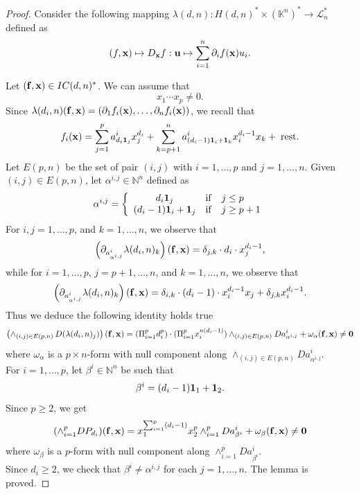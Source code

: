 \documentclass[11pt]{amsart}
\newcommand{\field}[1]{\mathbb{#1}}
\newcommand{\K}{\field{K}}
\newcommand{\N}{\field{N}}
\newcommand{\aph}{{\alpha}}
\newcommand{\bun}{{\bf 1}}
\newcommand{\bbo}{{\bf 0}}
\newcommand{\bbf}{{\bf f}}
\newcommand{\bu}{{\bf u}}
\newcommand{\bx}{{\bf x}}
\newcommand{\cL}{\mathcal{L}}
\newcommand{\dd}{{\partial}}
\newcommand{\dlt}{{\delta}}
\newcommand{\Kn}{{\K^n}}
\newcommand{\lbd}{{\lambda}}
\newcommand{\omg}{\omega}
\numberwithin{equation}{section}
\numberwithin{equation}{section}
\begin{document}
\begin{proof}
Consider the following mapping $\lbd(d,n) : H(d,n)^*\times (\Kn)^* 
\to \cL_n^*$ defined as
$$
(f,\bx) \mapsto D_\bx f :\bu \mapsto \sum_{i=1}^n \dd_i f(\bx) u_i.
$$

Let $(\bbf,\bx) \in IC(d,n)^*$. 
We can assume that 
$$
x_1\cdots x_p \neq 0.
$$
Since $\lbd(d_i,n)(\bbf,\bx) = (\dd_1f_i(\bx),\ldots,\dd_n f_i(\bx))$, we 
recall that 
$$
f_i (\bx) = \sum_{j=1}^p a_{d_i\bun_j}^i x_j^{d_i} + \sum_{k=p+1}^n
a_{(d_i-1)\bun_i + \bun_k}^i x_i^{d_i-1}x_k + \; {\rm  rest}.
$$
Let $E(p,n)$ be the set of pair $(i,j)$ with $i=1,\ldots,p$ and 
$j=1,\ldots,n$. Given $(i,j) \in E(p,n)$, let $\aph^{i,j} \in \N^n$ defined
as
$$
\aph^{i,j} = 
\left\{
\begin{array}{ccl}
d_i \bun_j & {\rm if} & j \leq p 
\\
(d_i-1)\bun_i + \bun_j  & {\rm if} & j \geq p + 1
\end{array}
\right.
$$
For $i,j = 1,\ldots,p$, and $k=1,\ldots,n$, we observe that
$$
\left(\dd_{a_{\aph^{i,j}}^i} \lbd(d_i,n)_k\right)(\bbf,\bx) = 
\dlt_{j,k}\cdot d_i \cdot x_j^{d_i-1},
$$
while for  $i= 1,\ldots,p$, $j = p+1,\ldots,n$, and $k=1,\ldots,n$,
we observe that
$$
\left(\dd_{a_{\aph^{i,j}}^i} \lbd(d_i,n)_k\right)(\bbf,\bx) = 
\dlt_{i,k}\cdot (d_i-1) \cdot x_i^{d_i-1}x_j + \dlt_{j,k} x_i^{d_i-1}.
$$
Thus we deduce the following identity holds true
$$
\left(\wedge_{(i,j)\in E(p,n)} \, D (\lbd(d_i,n)_j)\right)(\bbf,\bx) = 
(\Pi_{i=1}^p d_i^p) \cdot (\Pi_{i=1}^p x_i^{n(d_i-1)} )
\wedge_{(i,j)\in E(p,n)}  Da_{\aph^{i,j}}^i + \omg_\aph (\bbf,\bx)
\neq \bbo
$$
where $\omg_\aph$ is a $p\times n$-form with null component along 
$\wedge_{(i,j)\in E(p,n)} Da_{\aph^{i,j}}^i$.
\\
For $i=1,\ldots,p$, let $\beta^i\in \N^n$ be such that
$$
\beta^i = (d_i -1)\bun_1 + \bun_2. 
$$
Since $p\geq 2$, we get
$$
(\wedge_{i=1}^p D P_{d_i})(\bbf,\bx) = x_1^{\sum_{i=1}^p (d_i-1)}
x_2^p \wedge_{i=1}^p Da_{\beta^i}^i + \omg_\beta(\bbf,\bx) \neq \bbo
$$
where $\omg_\beta$ is a $p$-form with null component along $\wedge_{i=1}^p 
Da_{\beta^i}^i$.
\\
Since $d_i\geq 2$, we check that $\beta^i \neq \aph^{i,j}$ for each 
$j=1,\ldots,n$. The lemma is proved.
\end{proof}
%
%
\end{document}
